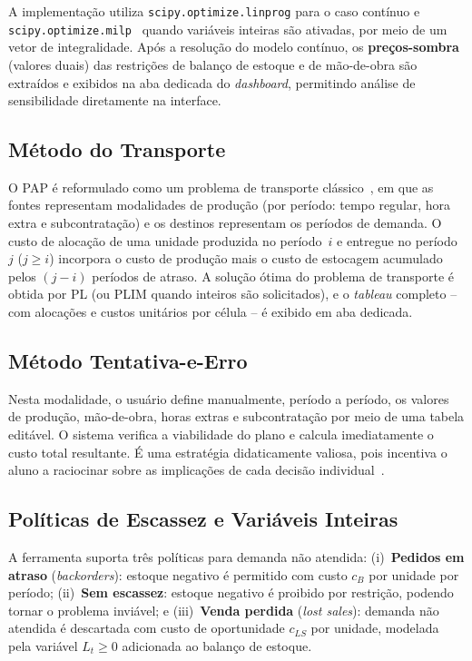 \documentclass[a4paper,11pt]{article}
\begin{document}
A implementação utiliza \texttt{scipy.optimize.linprog} para o caso contínuo e
\texttt{scipy.optimize.milp}~\citep{scipy2020} quando variáveis inteiras são ativadas,
por meio de um vetor de integralidade. Após a resolução do modelo contínuo, os
\textbf{preços-sombra} (valores duais) das restrições de balanço de estoque e de
mão-de-obra são extraídos e exibidos na aba dedicada do \textit{dashboard}, permitindo
análise de sensibilidade diretamente na interface.

\subsection{Método do Transporte}

O PAP é reformulado como um problema de transporte clássico~\citep{bowman1956}, em que
as fontes representam modalidades de produção (por período: tempo regular, hora extra e
subcontratação) e os destinos representam os períodos de demanda. O custo de alocação
de uma unidade produzida no período~$i$ e entregue no período~$j$ ($j \geq i$) incorpora
o custo de produção mais o custo de estocagem acumulado pelos $(j-i)$ períodos de atraso.
A solução ótima do problema de transporte é obtida por PL (ou PLIM quando inteiros são
solicitados), e o \textit{tableau} completo -- com alocações e custos unitários por
célula -- é exibido em aba dedicada.

\subsection{Método Tentativa-e-Erro}

Nesta modalidade, o usuário define manualmente, período a período, os valores de
produção, mão-de-obra, horas extras e subcontratação por meio de uma tabela editável.
O sistema verifica a viabilidade do plano e calcula imediatamente o custo total resultante.
É uma estratégia didaticamente valiosa, pois incentiva o aluno a raciocinar sobre as
implicações de cada decisão individual~\citep{heizer2017}.

\subsection{Políticas de Escassez e Variáveis Inteiras}

A ferramenta suporta três políticas para demanda não atendida:
(i)~\textbf{Pedidos em atraso} (\textit{backorders}): estoque negativo é permitido com
custo $c_B$ por unidade por período; (ii)~\textbf{Sem escassez}: estoque negativo é
proibido por restrição, podendo tornar o problema inviável; e
(iii)~\textbf{Venda perdida} (\textit{lost sales}): demanda não atendida é descartada
com custo de oportunidade $c_{LS}$ por unidade, modelada pela variável $L_t \geq 0$
adicionada ao balanço de estoque.
\end{document}
